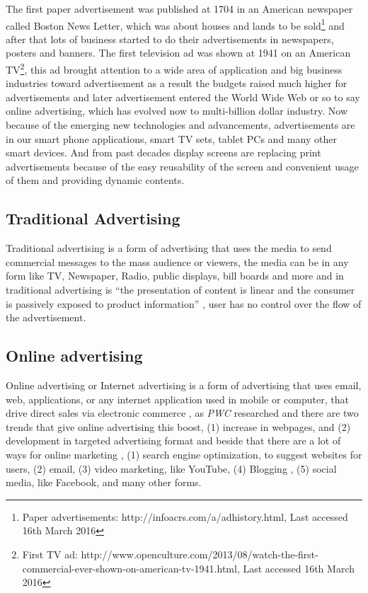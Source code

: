 The first paper advertisement was published at 1704 in an American newspaper called Boston News Letter, which was about houses and lands to be sold\footnote{Paper advertisements: http://infoacrs.com/a/adhistory.html, Last accessed 16th March 2016} and after that lots of business started to do their advertisements in newspapers, posters and banners. The first television ad was shown at 1941 on an American TV\footnote {First TV ad: http://www.openculture.com/2013/08/watch-the-first-commercial-ever-shown-on-american-tv-1941.html, Last accessed 16th March 2016}, this ad brought attention to a wide area of application and big business industries toward advertisement as a result the budgets raised much higher for advertisements and later advertisement entered the World Wide Web or so to say online advertising, which has evolved now to multi-billion dollar industry. Now because of the emerging new technologies and advancements, advertisements are in our smart phone applications, smart TV sets, tablet PCs and many other smart devices. And from past decades display screens are replacing print advertisements because of the easy reusability of the screen and convenient usage of them and providing dynamic contents.


\subsection{Traditional Advertising}
Traditional advertising is a form of advertising that uses the media to send commercial messages to the mass audience or viewers, the media can be in any form like TV, Newspaper, Radio, public displays, bill boards and more and in traditional advertising is “the presentation of content is linear and the consumer is passively exposed to product information” \cite{Non_inter_vs_interAd}, user has no control over the flow of the advertisement. 

\subsection{Online advertising}
Online advertising or Internet advertising is a form of advertising that uses email, web, applications, or any internet application used in mobile or computer, that drive direct sales via electronic commerce \cite{onlinead}, as \emph{PWC}  \cite{pwc} researched and there are two trends that give online advertising this boost, (1) increase in webpages, and (2) development in targeted advertising format and beside that there are a lot of ways for online marketing \cite{waysmarketing}, (1) search engine optimization, to suggest websites for users, (2) email, (3) video marketing, like YouTube, (4) Blogging , (5) social media, like Facebook, and many other forms.

